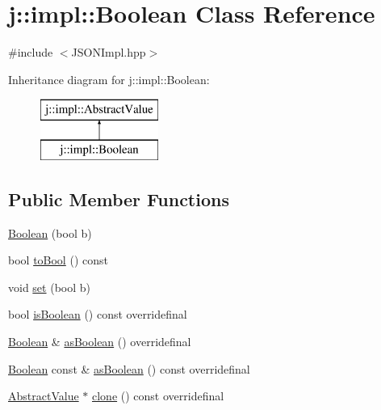 \hypertarget{classj_1_1impl_1_1_boolean}{\section{j\-:\-:impl\-:\-:Boolean Class Reference}
\label{classj_1_1impl_1_1_boolean}
}


{\ttfamily \#include $<$J\-S\-O\-N\-Impl.\-hpp$>$}

Inheritance diagram for j\-:\-:impl\-:\-:Boolean\-:\begin{figure}[H]
\begin{center}
\leavevmode
\includegraphics[height=2.000000cm]{classj_1_1impl_1_1_boolean}
\end{center}
\end{figure}
\subsection*{Public Member Functions}
\begin{DoxyCompactItemize}
\item 
\hyperlink{classj_1_1impl_1_1_boolean_ac7ab85db9285ce51045c11983ab2ae33}{Boolean} (bool b)
\item 
bool \hyperlink{classj_1_1impl_1_1_boolean_adae7a97a54365489999ccdf1495dfaaf}{to\-Bool} () const 
\item 
void \hyperlink{classj_1_1impl_1_1_boolean_adb2b2d763b3e93b7464ae87498036899}{set} (bool b)
\item 
bool \hyperlink{classj_1_1impl_1_1_boolean_ab27b415c6e0d08400ca53b5c5bcde6d2}{is\-Boolean} () const overridefinal
\item 
\hyperlink{classj_1_1impl_1_1_boolean}{Boolean} \& \hyperlink{classj_1_1impl_1_1_boolean_a1f96b1193d7fbc41bd58fed33874f2ad}{as\-Boolean} () overridefinal
\item 
\hyperlink{classj_1_1impl_1_1_boolean}{Boolean} const \& \hyperlink{classj_1_1impl_1_1_boolean_a174f6cfb37900f17708bf4fb34d94aa6}{as\-Boolean} () const overridefinal
\item 
\hyperlink{classj_1_1impl_1_1_abstract_value}{Abstract\-Value} $\ast$ \hyperlink{classj_1_1impl_1_1_boolean_a299b417212ed86a52b08e2bdbd6921f0}{clone} () const overridefinal
\end{DoxyCompactItemize}
